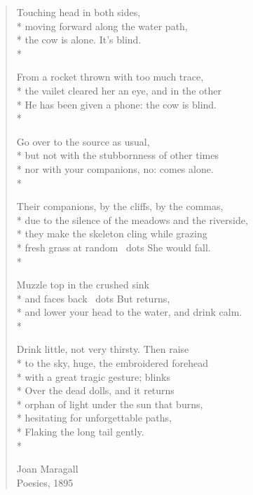 \documentclass[a4paper,
                             twoside,
                             BCOR=1.0cm,
                             DIV=11,
                             parskip=full,
                             11pt]{scrbook}
\begin{document}
\begin{verse}
    Touching head in both sides, \\*
    moving forward along the water path, \\*
    the cow is alone. It's blind. \\*
    \medskip

    From a rocket thrown with too much trace, \\*
    the vailet cleared her an eye, and in the other \\*
    He has been given a phone: the cow is blind. \\*
    \medskip

    Go over to the source as usual, \\*
    but not with the stubbornness of other times \\*
    nor with your companions, no: comes alone. \\*
    \medskip

    Their companions, by the cliffs, by the commas, \\*
    due to the silence of the meadows and the riverside, \\*
    they make the skeleton cling while grazing \\*
    fresh grass at random \ dots She would fall. \\*
    \medskip

    Muzzle top in the crushed sink \\*
    and faces back \ dots But returns, \\*
    and lower your head to the water, and drink calm. \\*
    \medskip

    Drink little, not very thirsty. Then raise \\*
    to the sky, huge, the embroidered forehead \\*
    with a great tragic gesture; blinks \\*
    Over the dead dolls, and it returns \\*
    orphan of light under the sun that burns, \\*
    hesitating for unforgettable paths, \\*
    Flaking the long tail gently. \\*
    \medskip
    \begin{flushright}
        Joan Maragall\\
        Poesies, 1895\\
    \end{flushright}
\end{verse}
\end{document}
